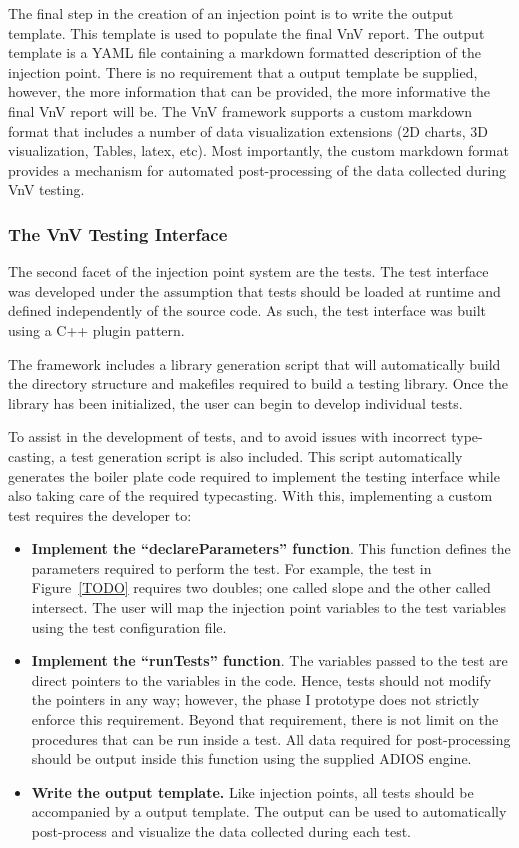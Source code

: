 The final step in the creation of an injection point is to write the output template. This template is used to populate 
the final VnV report. The output template is a YAML file containing a markdown formatted description of the injection point. There is 
no requirement that a output template be supplied, however, the more information that can be provided, the more informative the final VnV report will be. The VnV framework supports a custom markdown format that includes a number of data visualization extensions (2D charts, 3D visualization, Tables, latex, etc). Most importantly, the custom markdown format provides a mechanism for automated post-processing of the data collected during VnV testing. 

\subsubsection{The VnV Testing Interface}

The second facet of the injection point system are the \VV tests. The test interface was developed under the assumption that tests should be loaded at runtime and defined independently of the source code. As such, the test interface was built using a C++ plugin pattern. 

The framework includes a library generation script that will automatically build the directory structure and makefiles required to 
build a testing library. Once the library has been initialized, the user can begin to develop individual tests. 

To assist in the development of tests, and to avoid issues with incorrect type-casting, a test generation script is also included. This script automatically generates the boiler plate code required to implement the testing interface while also taking care of the required typecasting. With this, implementing a custom test requires the developer to:

\begin{itemize}
 \item {\bf Implement the ``declareParameters'' function}. This function defines the parameters required to perform
 the test. For example, the test in Figure~\ref{TODO} requires two doubles; one called slope and the other called intersect. The user will map the injection point variables to the test variables using the test configuration file. 
 \item {\bf Implement the ``runTests'' function}. The variables passed to the test are direct pointers to the variables in the code. Hence, tests should not modify the pointers in any way; however, the phase I prototype does not strictly enforce this requirement. Beyond that requirement, there is not limit on the procedures that can be run inside a test. All data required for post-processing should be output inside this function using the supplied ADIOS engine. 
 \item {\bf Write the output template.} Like injection points, all tests should be accompanied by a output template. The output can be used to automatically post-process and visualize the data collected during each test. 
\end{itemize}


